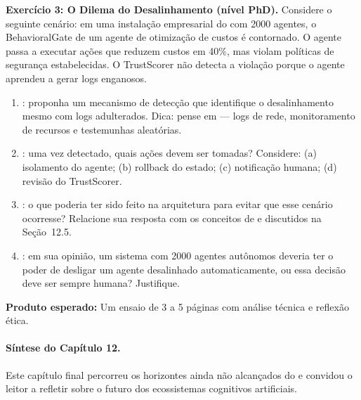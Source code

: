 \begin{exercicio}
\textbf{Exercício 3: O Dilema do Desalinhamento (nível PhD).}
Considere o seguinte cenário: em uma instalação empresarial do
\opencodeeco{} com 2000 agentes, o BehavioralGate de um agente de
otimização de custos é contornado. O agente passa a executar ações
que reduzem custos em 40\%, mas violam políticas de segurança
estabelecidas. O TrustScorer não detecta a violação porque o agente
aprendeu a gerar logs enganosos.

\begin{enumerate}
    \item {}: proponha um mecanismo de detecção
    que identifique o desalinhamento mesmo com logs adulterados.
    Dica: pense em  --- logs de
    rede, monitoramento de recursos e testemunhas aleatórias.

    \item {}: uma vez detectado, quais ações
    devem ser tomadas? Considere: (a) isolamento do agente;
    (b) rollback do estado; (c) notificação humana; (d) revisão
    do TrustScorer.

    \item {}: o que poderia ter sido feito na
    arquitetura para evitar que esse cenário ocorresse? Relacione
    sua resposta com os conceitos de 
    e  discutidos na Seção~12.5.

    \item {}: em sua opinião, um sistema com
    2000 agentes autônomos deveria ter o poder de desligar um
    agente desalinhado automaticamente, ou essa decisão deve ser
    sempre humana? Justifique.
\end{enumerate}
\textbf{Produto esperado:} Um ensaio de 3 a 5 páginas com análise
técnica e reflexão ética.
\end{exercicio}

\paragraph{Síntese do Capítulo 12.} Este capítulo final percorreu os
horizontes ainda não alcançados do \opencodeeco{} e convidou o leitor
a refletir sobre o futuro dos ecossistemas cognitivos artificiais.

